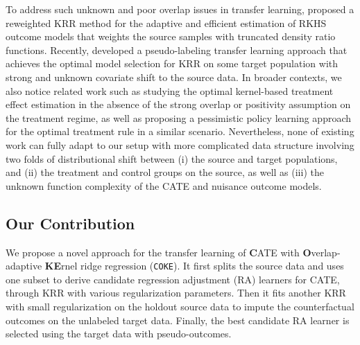\documentclass[12pt,a4paper,pdftex,onepage]{article}
\begin{document}
To address such unknown and poor overlap issues in transfer learning, \cite{ma2023optimally} proposed a reweighted KRR method for the adaptive and efficient estimation of RKHS outcome models that weights the source samples with truncated density ratio functions. Recently, \cite{wang2023pseudo} developed a pseudo-labeling transfer learning approach that achieves the optimal model selection for KRR on some target population with strong and unknown covariate shift to the source data. In broader contexts, we also notice related work such as \cite{mou2023kernel} studying the optimal kernel-based treatment effect estimation in the absence of the strong overlap or positivity assumption on the treatment regime, as well as \cite{jin2022policy} proposing a pessimistic policy learning approach for the optimal treatment rule in a similar scenario. Nevertheless, none of existing work can fully adapt to our setup with more complicated data structure involving two folds of distributional shift between (i) the source and target populations, and (ii) the treatment and control groups on the source, as well as (iii) the unknown function complexity of the CATE and nuisance outcome models. 


\subsection{Our Contribution}

We propose a novel approach for the transfer learning of {\bf C}ATE with {\bf O}verlap-adaptive {\bf KE}rnel ridge regression (\texttt{COKE}). It first splits the source data and uses one subset to derive candidate regression adjustment (RA) learners for CATE, through KRR with various regularization parameters. Then it fits another KRR with small regularization on the holdout source data to impute the counterfactual outcomes on the unlabeled target data. Finally, the best candidate RA learner is selected using the target data with pseudo-outcomes.
\end{document}
